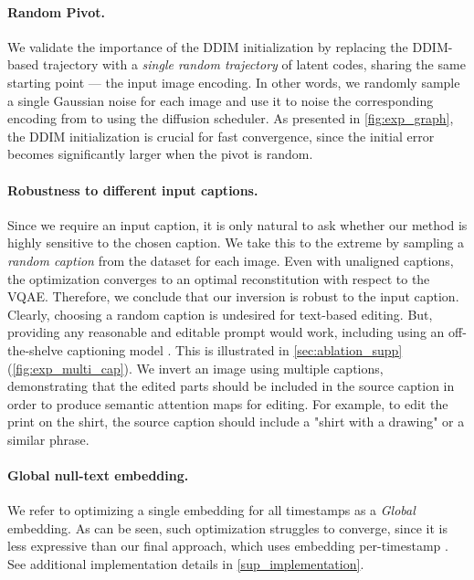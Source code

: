 \vspace{-0.4cm}
\paragraph{Random Pivot.}
We validate the importance of the DDIM initialization by replacing the DDIM-based trajectory with a \textit{single random trajectory} of latent codes, sharing the same starting point  --- the input image encoding. In other words, we randomly sample a single Gaussian noise  for each image and use it to noise the corresponding encoding  from  to  using the diffusion scheduler. As presented in \cref{fig:exp_graph}, the DDIM initialization is crucial for fast convergence, since the initial error becomes significantly larger when the pivot is random. 




\vspace{-0.4cm}
\paragraph{Robustness to different input captions.}
Since we require an input caption, it is only natural to ask whether our method is highly sensitive to the chosen caption. We take this to the extreme by sampling a \textit{random caption} from the dataset for each image. Even with unaligned captions, the optimization converges to an optimal reconstitution with respect to the VQAE. Therefore, we conclude that our inversion is robust to the input caption. Clearly, choosing a random caption is undesired for text-based editing. But, providing any reasonable and editable prompt would work, including using an off-the-shelve captioning model \cite{mokady2021clipcap, stefanini2022show}. This is illustrated in \cref{sec:ablation_supp} (\cref{fig:exp_multi_cap}). We invert an image using multiple captions, demonstrating that the edited parts should be included in the source caption in order to produce semantic attention maps for editing. For example, to edit the print on the shirt, the source caption should include a "shirt with a drawing" or a similar phrase.


\vspace{-0.4cm}
\paragraph{Global null-text embedding.}
We refer to optimizing a single embedding  for all timestamps as a \textit{Global} embedding. As can be seen, such optimization struggles to converge, since it is less expressive than our final approach, which uses embedding per-timestamp . See additional implementation details in \cref{sup_implementation}.



